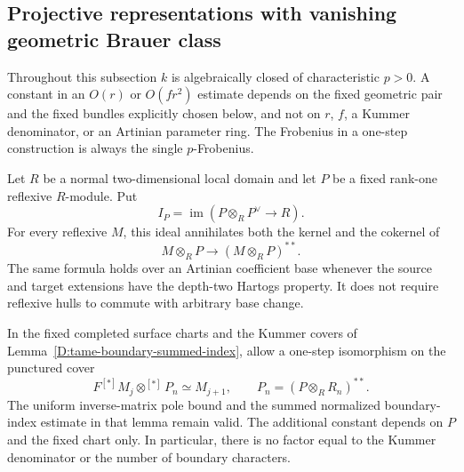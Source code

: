 \subsection{Projective representations with vanishing geometric Brauer class}

Throughout this subsection $k$ is algebraically closed of characteristic
$p>0$.  A constant in an $O(r)$ or $O(fr^2)$ estimate depends on the
fixed geometric pair and the fixed bundles explicitly chosen below,
and not on $r$, $f$, a Kummer denominator, or an Artinian parameter ring.
The Frobenius in a one-step construction is always the single
$p$-Frobenius.

\begin{lemma}
\label{D:fixed-tensor-boundary-comparison}
Let $R$ be a normal two-dimensional local domain and let $P$ be
a fixed rank-one reflexive $R$-module.  Put
\[
 I_P=\operatorname{im}(P\otimes_R P^\vee\longrightarrow R).
                                                        \tag{D.BZ.1}
\]
For every reflexive $M$, this ideal annihilates both the kernel
and the cokernel of
\[
             M\otimes_RP\longrightarrow (M\otimes_RP)^{**}.
                                                        \tag{D.BZ.2}
\]
The same formula holds over an Artinian coefficient base whenever
the source and target extensions have the depth-two Hartogs property.
It does not require reflexive hulls to commute with arbitrary base
change.

In the fixed completed surface charts and the Kummer covers of
Lemma~\ref{D:tame-boundary-summed-index}, allow a one-step
isomorphism on the punctured cover
\[
       F^{[*]}M_j\otimes^{[*]}P_n \simeq M_{j+1},
       \qquad P_n=(P\otimes_RR_n)^{**}.
                                                        \tag{D.BZ.3}
\]
The uniform inverse-matrix pole bound and the summed normalized
boundary-index estimate in that lemma remain valid.  The additional
constant depends on $P$ and the fixed chart only.  In particular,
there is no factor equal to the Kummer denominator or the number
of boundary characters.
\end{lemma}

